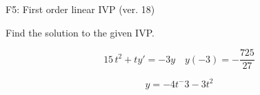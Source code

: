 \begin{exercise}
  \begin{exerciseTitle}F5: First order linear IVP (ver. 18)\end{exerciseTitle}
  \begin{exerciseStatement}
    
Find the solution to the given IVP.

    
\[15 \, t^{2} +ty'= -3 y \hspace{1em} y( -3 ) = -\frac{725}{27}\]

  \end{exerciseStatement}
  \begin{exerciseAnswer}
    
\[y= -4 t^ -3 -3 t^{2}\]

  \end{exerciseAnswer}
\end{exercise}